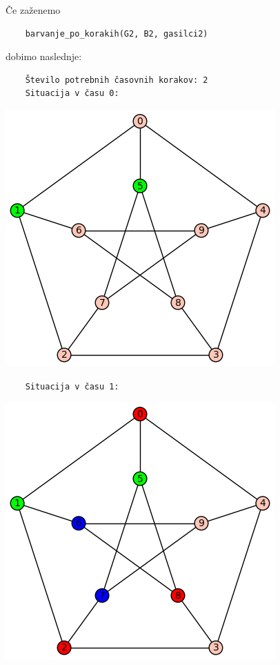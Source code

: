 \documentclass[a4paper, 12pt]{article}
\begin{document}
\noindent Če zaženemo
\begin{verbatim}
    barvanje_po_korakih(G2, B2, gasilci2)
\end{verbatim}
dobimo naslednje:
\begin{verbatim}
    Število potrebnih časovnih korakov: 2
    Situacija v času 0:
\end{verbatim}
    \begin{center}
        \includegraphics[scale=0.5]{peterson0}
    \end{center}
\begin{verbatim}
    Situacija v času 1:
\end{verbatim}
    \begin{center}
        \includegraphics[scale=0.5]{peterson1}
    \end{center}
\end{document}
